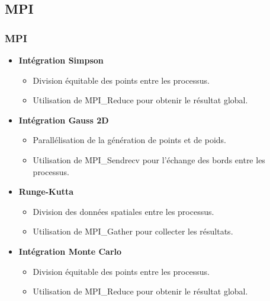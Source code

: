 \documentclass[10pt]{beamer}
\begin{document}
\subsection{MPI}
\begin{frame}
    \frametitle{MPI}
    \small
    \begin{itemize}
        \item \textbf{Intégration Simpson}
            \begin{itemize}
                \item Division équitable des points entre les processus.
                \item Utilisation de MPI\_Reduce pour obtenir le résultat global.
            \end{itemize}
        \item \textbf{Intégration Gauss 2D}
            \begin{itemize}
                \item Parallélisation de la génération de points et de poids.
                \item Utilisation de MPI\_Sendrecv pour l'échange des bords entre les processus.
            \end{itemize}
        \item \textbf{Runge-Kutta}
            \begin{itemize}
                \item Division des données spatiales entre les processus.
                \item Utilisation de MPI\_Gather pour collecter les résultats.
            \end{itemize}
        \item \textbf{Intégration Monte Carlo }
            \begin{itemize}
                \item Division équitable des points entre les processus.
                \item Utilisation de MPI\_Reduce pour obtenir le résultat global.
            \end{itemize}
    \end{itemize}
\end{frame}


  
  
\end{document}
